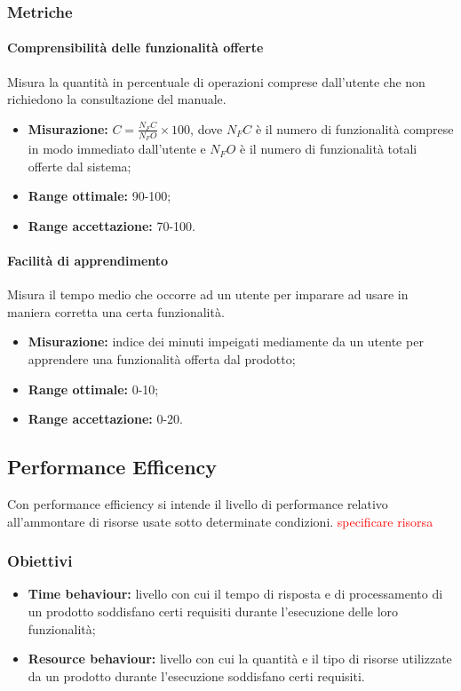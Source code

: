 		\subsubsection{Metriche}
			\paragraph{Comprensibilità delle funzionalità offerte} \Spazio 
			Misura la quantità in percentuale di operazioni comprese dall'utente che non richiedono la consultazione del manuale.
			\begin{itemize}
				\item {\textbf{Misurazione:} $C=\frac{N_FC}{N_FO}\times 100$, dove $N_FC$ è il numero di funzionalità comprese in modo immediato dall'utente e $N_FO$ è il numero di funzionalità totali offerte dal sistema};
				\item {\textbf{Range ottimale:} 90-100;}
				\item {\textbf{Range accettazione:} 70-100.}
			\end{itemize} 
			\paragraph{Facilità di apprendimento} \Spazio 
			Misura il tempo medio che occorre ad un utente per imparare ad usare in maniera corretta una certa funzionalità.
			\begin{itemize}
				\item {\textbf{Misurazione:} indice dei minuti impeigati mediamente da un utente per apprendere una funzionalità offerta dal prodotto};
				\item {\textbf{Range ottimale:} 0-10;}
				\item {\textbf{Range accettazione:} 0-20.}
			\end{itemize} 
			
	\subsection{Performance Efficency}
		Con performance efficiency si intende il livello di performance relativo all'ammontare di risorse usate sotto determinate condizioni. \textcolor{red}{specificare risorsa}
		\subsubsection{Obiettivi}
			\begin{itemize}
				\item {\textbf{Time behaviour:} livello con cui il tempo di risposta e di processamento di un prodotto soddisfano certi requisiti durante l'esecuzione delle loro funzionalità;}
				\item {\textbf{Resource behaviour:} livello con cui la quantità e il tipo di risorse utilizzate da un prodotto durante l'esecuzione soddisfano certi requisiti.}
			\end{itemize}
